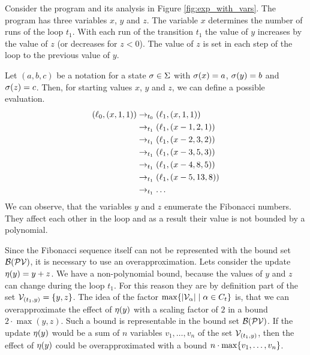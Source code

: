 \begin{example}
  
  Consider the program and its analysis in Figure \ref{fig:exp_with_vars}.  
  The program has three variables $x$, $y$ and $z$.
  The variable $x$ determines the number of runs of the loop $t_1$.
  With each run of the transition $t_1$ the value of $y$ increases by the value of $z$ (or decreases for $z < 0$).
  The value of $z$ is set in each step of the loop to the previous value of $y$.
  
  Let $(a,b,c)$ be a notation for a state $\sigma \in \Sigma$ with $\sigma(x) = a$, $\sigma(y) = b$ and $\sigma(z) = c$.
  Then, for starting values $x$, $y$ and $z$, we can define a possible evaluation.
  \begin{align*}
    (\ell_0, (x,1,1)) & \rightarrow_{t_0} (\ell_1, (x,1,1)) \\
    & \rightarrow_{t_1} (\ell_1, (x-1,2,1)) \\
    & \rightarrow_{t_1} (\ell_1, (x-2,3,2)) \\
    & \rightarrow_{t_1} (\ell_1, (x-3,5,3)) \\
    & \rightarrow_{t_1} (\ell_1, (x-4,8,5)) \\
    & \rightarrow_{t_1} (\ell_1, (x-5,13,8)) \\
    & \rightarrow_{t_1} \dots
  \end{align*}
  We can observe, that the variables $y$ and $z$ enumerate the Fibonacci numbers.
  They affect each other in the loop and as a result their value is not bounded by a polynomial.
  
  Since the Fibonacci sequence itself can not be represented with the bound set $\mathcal{B}(\mathcal{PV})$, it is necessary to use an overapproximation.
  Lets consider the update $\eta(y) = y + z$.
  We have a non-polynomial bound, because the values of $y$ and $z$ can change during the loop $t_1$.
  For this reason they are by definition part of the set $\mathcal{V}_{(t_1,y)} = \lbrace y,z \rbrace$.
  The idea of the factor $\max \lbrace \left|\mathcal{V}_\alpha\right| \mid \alpha \in C_t \rbrace$ is, that we can overapproximate the effect of $\eta(y)$ with a scaling factor of $2$ in a bound $2 \cdot \max(y,z)$.
  Such a bound is representable in the bound set $\mathcal{B}(\mathcal{PV})$.
  If the update $\eta(y)$ would be a sum of $n$ variables $v_1, \dots, v_n$ of the set $\mathcal{V}_{(t_1,y)}$, then the effect of $\eta(y)$ could be overapproximated with a bound $n \cdot \max \lbrace v_1, \dots, v_n \rbrace$.
\end{example}

